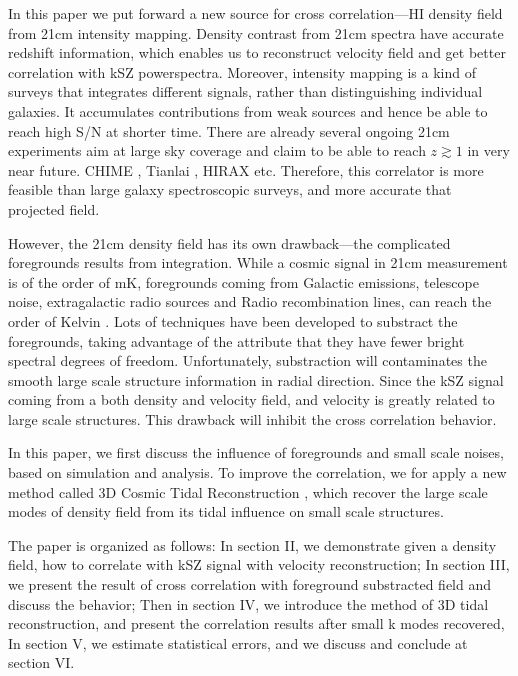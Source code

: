 In this paper we put forward a new source for cross correlation---HI density field from 21cm intensity mapping. 
Density contrast from 21cm spectra have accurate redshift information, 
which enables us to reconstruct velocity field and 
get better correlation with kSZ powerspectra. 
Moreover, intensity mapping is a kind of surveys that 
integrates different signals, 
rather than distinguishing individual galaxies. 
It accumulates contributions from weak sources 
and hence be able to reach high S/N at shorter time. 
There are already several ongoing 21cm experiments aim at large sky coverage and claim to be able to reach $z\gtrsim1$ in very near future.
CHIME \cite{2014SPIE.9145E..22B}, Tianlai \cite{2015ApJ...798...40X}, 
HIRAX \cite{HIRAX} etc.
Therefore, this correlator is more feasible than large galaxy spectroscopic surveys, 
and more accurate that projected field.

However, the 21cm density field has its own drawback---the complicated foregrounds results from integration. 
While a cosmic signal in 21cm measurement is of the order of mK,  
foregrounds coming from Galactic emissions, telescope noise, 
extragalactic radio sources and Radio recombination lines, 
can reach the order of Kelvin \cite{DiMatteo04}\cite{Masui13}. 
Lots of techniques have been developed to substract the foregrounds, 
taking advantage of the attribute that they have fewer bright spectral
degrees of freedom\cite{Switzer15}.
Unfortunately, substraction will contaminates the smooth large scale structure information in radial direction.
Since the kSZ signal coming from a both density and velocity field, 
and velocity is greatly related to large scale structures. 
This drawback will inhibit the cross correlation behavior.

In this paper, 
we first discuss the influence of foregrounds and small scale noises, 
based on simulation and analysis. 
To improve the correlation, we for apply a new method called 3D Cosmic Tidal Reconstruction \cite{2012:pen}\cite{2015:zhu}, which recover the large scale modes of density field from its tidal influence on small scale structures. 

The paper is organized as follows: 
In section II, we demonstrate given a density field, how to correlate with kSZ signal with velocity reconstruction; 
In section III, we present the result of cross correlation with foreground substracted field 
and discuss the behavior; 
Then in section IV, we introduce the method of 3D tidal reconstruction, 
and present the correlation results after small k modes recovered, 
In section V, we estimate statistical errors, 
and we discuss and conclude at section VI.

